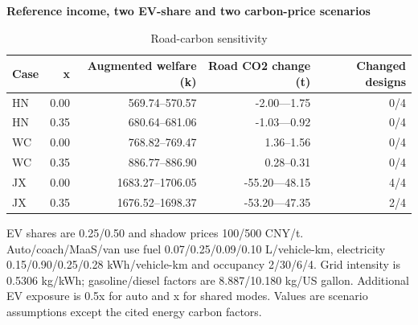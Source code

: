 \begin{table}[htbp]\centering
\caption{Road-carbon sensitivity}\label{tab:review_carbon}
\begin{minipage}{.95\textwidth}\fontsize{8}{10}\selectfont{}\setlength{\tabcolsep}{2pt}\renewcommand{\arraystretch}{1.08}
\par\noindent\textbf{Reference income, two EV-share and two carbon-price scenarios}\par\smallskip
\begin{tabular*}{\linewidth}{@{\extracolsep{\fill}}lrrrr@{}}\toprule
Case & x & Augmented welfare (k) & Road CO2 change (t) & Changed designs \\
\midrule
HN & 0.00 & 569.74--570.57 & -2.00---1.75 & 0/4 \\
HN & 0.35 & 680.64--681.06 & -1.03---0.92 & 0/4 \\
WC & 0.00 & 768.82--769.47 & 1.36--1.56 & 0/4 \\
WC & 0.35 & 886.77--886.90 & 0.28--0.31 & 0/4 \\
JX & 0.00 & 1683.27--1706.05 & -55.20---48.15 & 4/4 \\
JX & 0.35 & 1676.52--1698.37 & -53.20---47.35 & 2/4 \\
\bottomrule\end{tabular*}\par\medskip
\par\noindent\fontsize{8}{9.5}\selectfont EV shares are 0.25/0.50 and shadow prices 100/500 CNY/t. Auto/coach/MaaS/van use fuel 0.07/0.25/0.09/0.10 L/vehicle-km, electricity 0.15/0.90/0.25/0.28 kWh/vehicle-km and occupancy 2/30/6/4. Grid intensity is 0.5306 kg/kWh; gasoline/diesel factors are 8.887/10.180 kg/US gallon. Additional EV exposure is 0.5x for auto and x for shared modes. Values are scenario assumptions except the cited energy carbon factors.
\end{minipage}\end{table}
